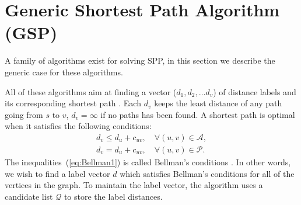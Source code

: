 \begin{comment}
\subsection{Forward Star}\label{chap:forwardstar}
all arcs emanating from a given node need to be accessed.
An efficient way of visiting every node inside a network and access all their emanating arcs is to use the Forward Star data structure.
The advantage of using this data structure for storing the network is that
the time complexity for finding any node in the network and iterating through all the emanating arcs is $O(1)$.
The exact implementation of Forward Star is not going to be detailed in this report,
but the information can be found in Chapter 5.3 of Urban Transportation Networks \citep{Sheffi}.
This data structure has already been implemented by the second supervisor.
\end{comment}


\section{Generic Shortest Path Algorithm (GSP)}

A family of algorithms exist for solving SPP,
in this section we describe the generic case for these
algorithms.

All of these algorithms aim at finding a 
vector ($d_1, d_2,\dots d_v$) of distance labels and its corresponding shortest path \citep{Klunder}.
Each $d_v$ keeps the least distance of any path going from $s$ to $v$, $d_v = \infty$ if no paths has been found.
A shortest path is optimal when it satisfies the following conditions:
\begin{align}
    d_v \leq d_u + c_{uv}, \quad \forall(u,v) \in \mathcal{A}, \label{eq:Bellman1}\\
    d_v  =   d_u + c_{uv}, \quad \forall(u,v) \in \mathcal{P}.
\end{align}
The inequalities~(\ref{eq:Bellman1}) is called Bellman's conditions \citep{Bellman}.
In other words,
we wish to find a label vector $d$ which satisfies Bellman's conditions for all of the vertices in the graph.
To maintain the label vector, the algorithm uses a candidate list $\mathcal{Q}$ to store the label distances.

